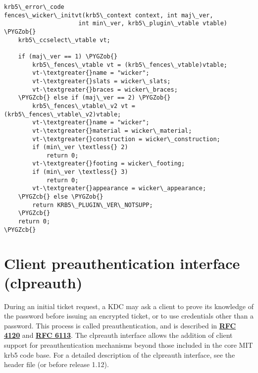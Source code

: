 \documentclass[letterpaper,10pt,english]{sphinxmanual}
\def\PYGZob{\char`\{}
\def\PYGZcb{\char`\}}
\begin{document}
\begin{Verbatim}[commandchars=\\\{\}]
krb5\_error\_code
fences\_wicker\_initvt(krb5\_context context, int maj\_ver,
                     int min\_ver, krb5\_plugin\_vtable vtable)
\PYGZob{}
    krb5\_ccselect\_vtable vt;

    if (maj\_ver == 1) \PYGZob{}
        krb5\_fences\_vtable vt = (krb5\_fences\_vtable)vtable;
        vt-\textgreater{}name = "wicker";
        vt-\textgreater{}slats = wicker\_slats;
        vt-\textgreater{}braces = wicker\_braces;
    \PYGZcb{} else if (maj\_ver == 2) \PYGZob{}
        krb5\_fences\_vtable\_v2 vt = (krb5\_fences\_vtable\_v2)vtable;
        vt-\textgreater{}name = "wicker";
        vt-\textgreater{}material = wicker\_material;
        vt-\textgreater{}construction = wicker\_construction;
        if (min\_ver \textless{} 2)
            return 0;
        vt-\textgreater{}footing = wicker\_footing;
        if (min\_ver \textless{} 3)
            return 0;
        vt-\textgreater{}appearance = wicker\_appearance;
    \PYGZcb{} else \PYGZob{}
        return KRB5\_PLUGIN\_VER\_NOTSUPP;
    \PYGZcb{}
    return 0;
\PYGZcb{}
\end{Verbatim}


\section{Client preauthentication interface (clpreauth)}
\label{plugindev/clpreauth:client-preauthentication-interface-clpreauth}\label{plugindev/clpreauth::doc}
During an initial ticket request, a KDC may ask a client to prove its
knowledge of the password before issuing an encrypted ticket, or to
use credentials other than a password.  This process is called
preauthentication, and is described in \href{http://tools.ietf.org/html/rfc4120.html}{\textbf{RFC 4120}} and \href{http://tools.ietf.org/html/rfc6113.html}{\textbf{RFC 6113}}.
The clpreauth interface allows the addition of client support for
preauthentication mechanisms beyond those included in the core MIT
krb5 code base.  For a detailed description of the clpreauth
interface, see the header file  (or
 before release 1.12).
\end{document}

